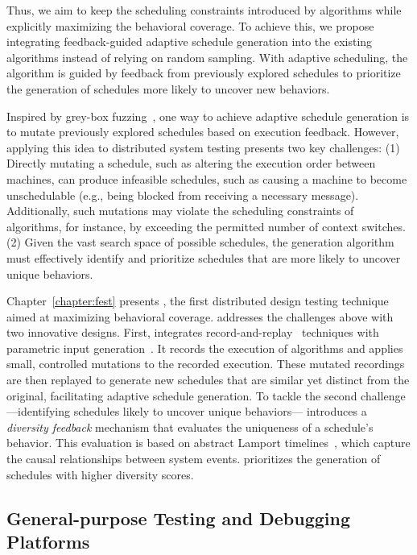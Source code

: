 Thus, we aim to keep the scheduling constraints introduced by {\RSBTShort} algorithms while explicitly maximizing the behavioral coverage. To achieve this, we propose integrating feedback-guided adaptive schedule generation into the existing {\RSBTShort} algorithms instead of relying on random sampling. With adaptive scheduling, the {\RSBTShort} algorithm is guided by feedback from previously explored schedules to prioritize the generation of schedules more likely to uncover new behaviors.

Inspired by grey-box fuzzing~\cite{Bohme16-aflfast}, one way to achieve adaptive schedule generation is to mutate previously explored schedules based on execution feedback. However, applying this idea to distributed system testing presents two key challenges: (1) Directly mutating a schedule, such as altering the execution order between machines, can produce infeasible schedules, such as causing a machine to become unschedulable (e.g., being blocked from receiving a necessary message). Additionally, such mutations may violate the scheduling constraints of {\RSBTShort} algorithms, for instance, by exceeding the permitted number of context switches. (2) Given the vast search space of possible schedules, the generation algorithm must effectively identify and prioritize schedules that are more likely to uncover unique behaviors.

Chapter~\ref{chapter:fest} presents {\fest}, the first distributed design testing technique aimed at maximizing behavioral coverage. {\fest} addresses the challenges above with two innovative designs. First, {\fest} integrates record-and-replay~\cite{Ochallahan17-rr} techniques with parametric input generation~\cite{Padhye19-zest}. It records the execution of {\RSBTShort} algorithms and applies small, controlled mutations to the recorded execution. These mutated recordings are then replayed to generate new schedules that are similar yet distinct from the original, facilitating adaptive schedule generation. To tackle the second challenge—identifying schedules likely to uncover unique behaviors—{\fest} introduces a \emph{diversity feedback} mechanism that evaluates the uniqueness of a schedule’s behavior. This evaluation is based on abstract Lamport timelines~\cite{Meng23-Mallory, Lamport78-lamporttimeline}, which capture the causal relationships between system events. {\fest} prioritizes the generation of schedules with higher diversity scores. 

\subsection{General-purpose Testing and Debugging Platforms}

